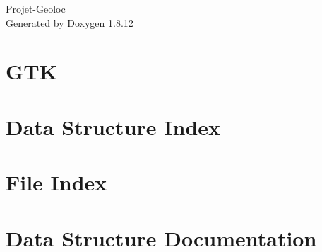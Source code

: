 \documentclass[twoside]{book}
\newcommand{\+}{\discretionary{\mbox{\scriptsize$\hookleftarrow$}}{}{}}
\newcommand{\clearemptydoublepage}{%
  \newpage{\pagestyle{empty}\cleardoublepage}%
}
\begin{document}
\hypersetup{pageanchor=false,
             bookmarksnumbered=true,
             pdfencoding=unicode
            }
\begin{titlepage}
\vspace*{7cm}
\begin{center}%
{\Large Projet-\/\+Geoloc }\\
\vspace*{1cm}
{\large Generated by Doxygen 1.8.12}\\
\end{center}
\end{titlepage}
\clearemptydoublepage
{}
\tableofcontents
\clearemptydoublepage
{}
\hypersetup{pageanchor=true}

\chapter{G\+TK}
\label{md___users_frj__documents__code__projet_prog_3a__code_front_tests_guillaume_interface__r_e_a_d_m_e}
\hypertarget{md___users_frj__documents__code__projet_prog_3a__code_front_tests_guillaume_interface__r_e_a_d_m_e}{}

\chapter{Data Structure Index}

\chapter{File Index}

\chapter{Data Structure Documentation}

































\end{document}
